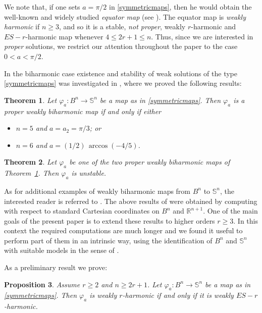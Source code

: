 \documentclass[11pt]{amsart}
\theoremstyle{plain}
\newtheorem{theorem}                {Theorem}      [section]
\newtheorem{proposition}  [theorem]  {Proposition}
\theoremstyle{definition}
\numberwithin{equation}{section}
\def \R{{\mathbb R}}
\def \s{{\mathbb S}}
\numberwithin{equation}{section}
\begin{document}
We note that, if one sets $a= \pi /2$ in \eqref{symmetricmaps}, then he would obtain the well-known and widely studied \textit{equator map} (see \cite{FMR2, JK}). The equator map is \textit{weakly harmonic} if $n \geq3$, and so it is a stable, \textit{not proper}, weakly $r$-harmonic and $ES-r$-harmonic map whenever $4\leq 2r+1\leq n$. Thus, since we are interested in \textit{proper} solutions, we restrict our attention throughout the paper to the case $0< a < \pi/2$.

In the biharmonic case existence and stability of weak solutions of the type \eqref{symmetricmaps} was investigated in \cite{FMR}, where we proved the following results:
\begin{theorem}\label{theorem-m=5-6biharmonic} \cite{FMR} Let
$\varphi_a:B^n \to \s^n$ be a map as in \eqref{symmetricmaps}. Then $\varphi_a$ is a proper weakly biharmonic map if and only if either
\begin{itemize}
\item[(i)] $n=5$ and $a=a_2=\pi \slash 3$; or
\item[(ii)] $n=6$ and $a=(1\slash 2)\,\arccos (-4\slash 5)$.
\end{itemize}
\end{theorem}
\begin{theorem}\label{stability-theorem} \cite{FMR} Let
$\varphi_a$ be one of the two proper weakly biharmonic maps of Theorem~\ref{theorem-m=5-6biharmonic}. Then $\varphi_a$ is unstable.
\end{theorem}
As for additional examples of weakly biharmonic maps from $B^n$ to $\mathbb S^n$, the interested reader is referred to \cite{Branding2025}. The above results of \cite{FMR} were obtained by computing with respect to standard Cartesian coordinates on $B^n$ and $\R^{n+1}$. One of the main goals of the present paper is to extend these results to higher orders $r \geq 3$. In this context the required computations are much longer and we found it useful to perform part of them in an intrinsic way, using the identification of $B^n$ and $\s^n$ with suitable models in the sense of \cite{GW}. 
\vspace{2mm}

As a preliminary result we prove:

\begin{proposition}\label{prop-equiv-r-harmonic-es-harmonic}
Assume $r\geq 2$ and $n\geq 2r+1$. Let $\varphi_a:B^n \to \s^n$ be a map as in \eqref{symmetricmaps}. Then $\varphi_a$ is weakly $r$-harmonic if and only if it is weakly $ES-r$-harmonic.
\end{proposition}
\end{document}
